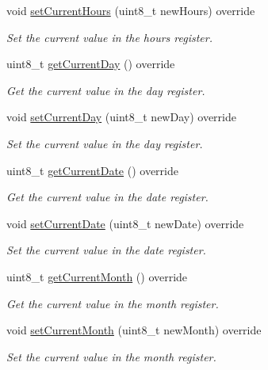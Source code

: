 \begin{DoxyCompactItemize}
void \mbox{\hyperlink{class_d_s3231_ae59c15abcccd8e27eadebcd150db810e}{set\+Current\+Hours}} (uint8\+\_\+t new\+Hours) override
\begin{DoxyCompactList}\small\item\em Set the current value in the hours register. \end{DoxyCompactList}\item 
uint8\+\_\+t \mbox{\hyperlink{class_d_s3231_a813bbe55a08e1911d498511795721477}{get\+Current\+Day}} () override
\begin{DoxyCompactList}\small\item\em Get the current value in the day register. \end{DoxyCompactList}\item 
void \mbox{\hyperlink{class_d_s3231_ae43a887db6022008c066a257acd68ae8}{set\+Current\+Day}} (uint8\+\_\+t new\+Day) override
\begin{DoxyCompactList}\small\item\em Set the current value in the day register. \end{DoxyCompactList}\item 
uint8\+\_\+t \mbox{\hyperlink{class_d_s3231_a346341a4d3c6615103b33fbff7a12884}{get\+Current\+Date}} () override
\begin{DoxyCompactList}\small\item\em Get the current value in the date register. \end{DoxyCompactList}\item 
void \mbox{\hyperlink{class_d_s3231_a597a0d5cb33f8b60f81dba9050ca1363}{set\+Current\+Date}} (uint8\+\_\+t new\+Date) override
\begin{DoxyCompactList}\small\item\em Set the current value in the date register. \end{DoxyCompactList}\item 
uint8\+\_\+t \mbox{\hyperlink{class_d_s3231_a8d7a965802afacc16b4d5af86e0ed11e}{get\+Current\+Month}} () override
\begin{DoxyCompactList}\small\item\em Get the current value in the month register. \end{DoxyCompactList}\item 
void \mbox{\hyperlink{class_d_s3231_a122611bf693cdd538178b99b893a7115}{set\+Current\+Month}} (uint8\+\_\+t new\+Month) override
\begin{DoxyCompactList}\small\item\em Set the current value in the month register. \end{DoxyCompactList}\item 

\end{DoxyCompactItemize}
